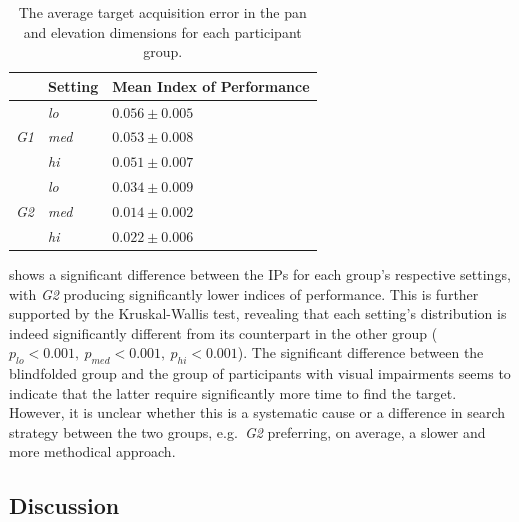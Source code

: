 \documentclass[acmsmall]{acmart}
\begin{document}
\begin{table}
  \centering
  \caption{The average target acquisition error in the pan and elevation dimensions for each participant group. }\label{tab:fitts-results}
  \begin{tabular}{p{0.5cm}p{1.5cm}p{2.5cm}}
    \toprule
    & Setting      & Mean Index of Performance \\ \midrule
    & \textit{lo}  & $0.056\pm0.005$ \\
    \textit{G1} & \textit{med} & $0.053\pm0.008$ \\
		& \textit{hi}  & $0.051\pm0.007$ \\ \cline{2-3}
    & \textit{lo}  & $0.034\pm0.009$ \\
    \textit{G2} & \textit{med} & $0.014\pm0.002$ \\
    & \textit{hi}  & $0.022\pm0.006$ \\
    \bottomrule
  \end{tabular}
\end{table}

 shows a significant difference between the IPs for each group's respective settings, with \textit{G2} producing significantly lower indices of performance.
This is further supported by the Kruskal-Wallis test, revealing that each setting's distribution is indeed significantly different from its counterpart in the other group ($p_{lo} < 0.001,~p_{med} < 0.001,~p_{hi} < 0.001$).
The significant difference between the blindfolded group and the group of participants with visual impairments seems to indicate that the latter require significantly more time to find the target. 
However, it is unclear whether this is a systematic cause or a difference in search strategy between the two groups, e.g.\ \textit{G2} preferring, on average, a slower and more methodical approach.

\subsection{Discussion}
\end{document}
